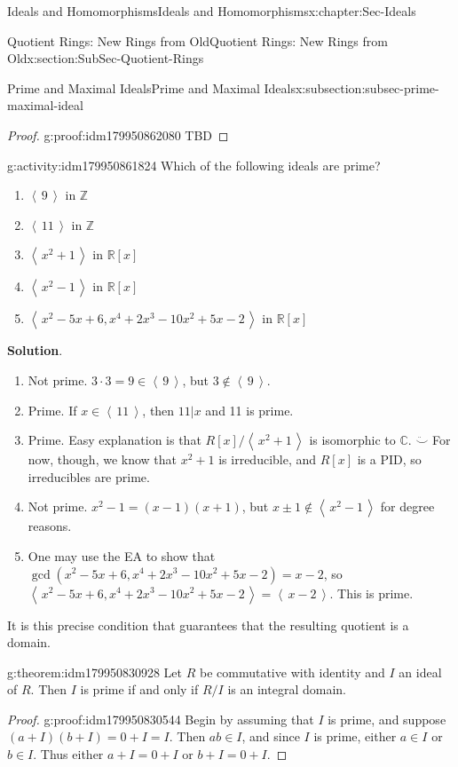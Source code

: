 \documentclass[oneside,10pt,]{book}
\newcommand{\blocktitlefont}{\relax}
\numberwithin{equation}{section}
\newcommand{\ideal}[1]{\left\langle\, #1 \,\right\rangle}
\def\C{{\mathbb C}}
\def\Z{{\mathbb Z}}
\def\R{{\mathbb R}}
\begin{document}
\begin{chapterptx}{Ideals and Homomorphisms}{}{Ideals and Homomorphisms}{}{}{x:chapter:Sec-Ideals}
\begin{sectionptx}{Quotient Rings: New Rings from Old}{}{Quotient Rings: New Rings from Old}{}{}{x:section:SubSec-Quotient-Rings}
\begin{subsectionptx}{Prime and Maximal Ideals}{}{Prime and Maximal Ideals}{}{}{x:subsection:subsec-prime-maximal-ideal}
\begin{proof}{}{g:proof:idm179950862080}
TBD\end{proof}
\begin{activity}{}{g:activity:idm179950861824}%
Which of the following ideals are prime?%
\begin{enumerate}
\item{}\(\ideal{9}\) in \(\Z\)%
\item{}\(\ideal{11}\) in \(\Z\)%
\item{}\(\ideal{x^2+1}\) in \(\R[x]\)%
\item{}\(\ideal{x^2-1}\) in \(\R[x]\)%
\item{}\(\ideal{x^2-5x+6, x^4+2x^3-10x^2+5x-2}\) in \(\R[x]\)%
\end{enumerate}
%
\par\smallskip%
\noindent\textbf{\blocktitlefont Solution}.\hypertarget{g:solution:idm179950842800}{}\quad{}%
\begin{enumerate}
\item{}Not prime. \(3\cdot 3= 9\in \ideal{9}\), but \(3\notin\ideal{9}\).%
\item{}Prime. If \(x\in \ideal{11}\), then \(11|x\) and 11 is prime.%
\item{}Prime. Easy explanation is that \(R[x]/\ideal{x^2+1}\) is isomorphic to \(\C\). \(\ddot\smile\) For now, though, we know that \(x^2+1\) is irreducible, and \(R[x]\) is a PID, so irreducibles are prime.%
\item{}Not prime. \(x^2-1 = (x-1)(x+1)\), but \(x\pm 1\notin \ideal{x^2-1}\) for degree reasons.%
\item{}One may use the EA to show that \(\gcd(x^2-5x+6,x^4+2x^3-10x^2+5x-2) = x-2\), so \(\ideal{x^2-5x+6, x^4+2x^3-10x^2+5x-2} = \ideal{x-2}\). This is prime.%
\end{enumerate}
%
\end{activity}
It is this precise condition that guarantees that the resulting quotient is a domain.%
\begin{theorem}{}{}{g:theorem:idm179950830928}%
Let \(R\) be commutative with identity and \(I\) an ideal of \(R\). Then \(I\) is prime if and only if \(R/I\) is an integral domain.%
\end{theorem}
\begin{proof}{}{g:proof:idm179950830544}
Begin by assuming that \(I\) is prime, and suppose \((a+I)(b+I) = 0+I = I\). Then \(ab \in I\), and since \(I\) is prime, either \(a\in I\) or \(b\in I\). Thus either \(a+I = 0+I\) or \(b+I = 0+I\).%
\par

\end{proof}
\end{subsectionptx}
\end{sectionptx}
\end{chapterptx}
\end{document}
